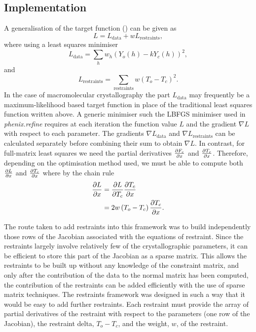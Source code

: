 \documentclass[pdf]{iucr}
\begin{document}
\subsection{Implementation}

A generalisation of the target function () can be given as
\begin{equation}
L = L_\text{data} + w L_\text{restraints}
\label{eqn:mm_target},
\end{equation}
where using a least squares minimiser
\begin{equation}
L_\text{data} = \sum_{h} w_h \left(Y_o(h) - k Y_c(h)\right)^2,
\label{eqn:mm_target_data:def}
\end{equation}
and
\begin{equation}
L_\text{restraints} = \sum_\text{restraints}{ w (T_o - T_c)^2}.
\label{eqn:mm_target_restraint:def}
\end{equation}
In the case of macromolecular crystallography the part $L_{\text{data}}$ may frequently be a maximum-likelihood based target function in place of the traditional least squares function written above. A generic minimiser such the LBFGS minimiser used in \emph{phenix.refine} \cite{Afonine:ba5180} requires at each iteration the function value $L$ and the  gradient $\nabla L$ with respect to each parameter. The gradients $\nabla L_\text{data}$ and $\nabla L_\text{restraints}$ can be calculated separately before combining their sum to obtain $\nabla L$. In contrast, for full-matrix least squares we need the partial derivatives $\frac{\partial F_c}{\partial x}$ and $\frac{\partial T_c}{\partial x}$. Therefore, depending on the optimisation method used, we must be able to compute both $\frac{\partial L}{\partial x}$ and $\frac{\partial T_c}{\partial x}$ where by the chain rule
\begin{align}
\frac{\partial L}{\partial x} &= \frac{\partial L}{\partial T_c} \frac{\partial T_c}{\partial x} \\
                             &= 2 w \left(T_o - T_c \right) \frac{\partial T_c}{\partial x}
\label{eqn:}.
\end{align}

The route taken to add restraints into this framework was to build independently those rows of the Jacobian associated with the equations of restraint. Since the restraints largely involve relatively few of the crystallographic parameters, it can be efficient to store this part of the Jacobian as a sparse matrix. This allows the restraints to be built up without any knowledge of the constraint matrix, and only after the contribution of the data to the normal matrix has been computed, the contribution of the restraints can be added efficiently with the use of sparse matrix techniques. The restraints framework was designed in such a way that it would be easy to add further restraints. Each restraint must provide the array of partial derivatives of the restraint with respect to the parameters (one row of the Jacobian), the restraint delta, $T_o - T_c$, and the weight, $w$, of the restraint.
\end{document}
